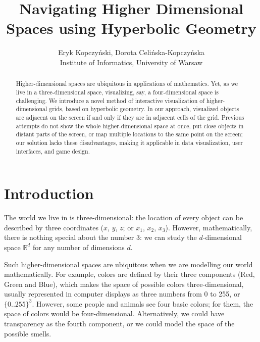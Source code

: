 \documentclass{article}
\begin{document}
\author {
    Eryk Kopczyński, Dorota Celińska-Kopczyńska  \\
    { \small Institute of Informatics, University of Warsaw}
}

\title{Navigating Higher Dimensional Spaces using Hyperbolic Geometry}


\maketitle

\begin{abstract}
 Higher-dimensional spaces are ubiquitous in applications of mathematics. 
  Yet, as we live in a three-dimensional space, visualizing, say, a four-dimensional
  space is challenging. We introduce a novel method of interactive visualization
  of higher-dimensional grids, based on hyperbolic geometry. In our approach, visualized objects are 
  adjacent on the screen if and only if they are in adjacent cells of the grid. Previous attempts
  do not show the whole higher-dimensional space at once, put close objects in distant parts of the screen,
  or map multiple locations to the same point on the screen; our solution lacks these disadvantages,
  making it applicable in data visualization, user interfaces, and game design.
\end{abstract}

\section{Introduction}

The world we live in is three-dimensional: the location of every
object can be described by three coordinates ($x$, $y$, $z$; or $x_1$,
$x_2$, $x_3$). However, mathematically, there is nothing special about
the number 3: we can study the $d$-dimensional space $\mathbb{R}^d$ 
for any number of dimensions $d$.

Such higher-dimensional spaces are ubiquitous when we are modelling
our world mathematically. For example, colors are defined by their
three components (Red, Green and Blue), which makes the space of
possible colors three-dimensional, usually represented in computer
displays as three numbers from 0 to 255, or $\{0..255\}^3$.
However, some people and animals see four basic colors; for them,
the space of colors would be four-dimensional. Alternatively, 
we could have transparency as the fourth component, or we could
model the space of the possible smells.
\end{document}
